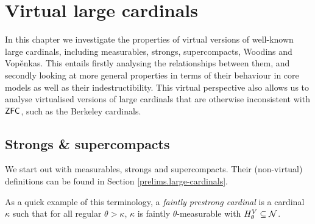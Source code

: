 \documentclass[../../main]{subfiles}
\begin{document}
\chapter{Virtual large cardinals}
\label{chapter.virtual-large-cardinals}
\thispagestyle{fancy}

In this chapter we investigate the properties of virtual versions of well-known large cardinals, including measurables, strongs, supercompacts, Woodins and Vop\v enkas. This entails firstly analysing the relationships between them, and secondly looking at more general properties in terms of their behaviour in core models as well as their indestructibility. This virtual perspective also allows us to analyse virtualised versions of large cardinals that are otherwise inconsistent with $\textsf{ZFC}$, such as the Berkeley cardinals.

\section{Strongs \& supercompacts}

We start out with measurables, strongs and supercompacts. Their (non-virtual) definitions can be found in Section \ref{prelims.large-cardinals}.


As a quick example of this terminology, a \textit{faintly prestrong cardinal} is a cardinal $\kappa$ such that for all regular $\theta>\kappa$, $\kappa$ is faintly $\theta$-measurable with $H_\theta^V\subseteq\operatorname{\mathcal N}$.
\end{document}
